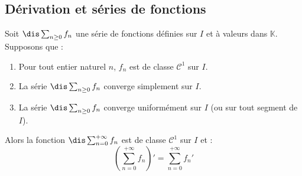 \documentclass[a4paper,10pt]{report}
\begin{document}
\begin{preuve} 

\vspace{11cm}
\end{preuve}

\subsection{Dérivation et séries de fonctions}

\begin{thm}
Soit $\dis \sum_{n \geq 0} f_n$ une série de fonctions définies sur $I$ et à valeurs dans $\mathbb{K}$. Supposons que :

\begin{enumerate}
\item Pour tout entier naturel $n$, $f_n$ est de classe $\mathcal{C}^1$ sur $I$.
\item La série $\dis \sum_{n \geq 0} f_n$ converge simplement sur $I$.
\item La série $\dis \sum_{n \geq 0} f_n$ converge uniformément sur $I$ (ou sur tout segment de $I$).
\end{enumerate}
Alors la fonction $\dis \sum_{n=0}^{+ \infty} f_n$ est de classe $\mathcal{C}^1$ sur $I$ et :
$$ \left( \sum_{n=0}^{+ \infty} f_n \right)' = \sum_{n=0}^{+ \infty} f_n'$$
\end{thm}
\end{document}
